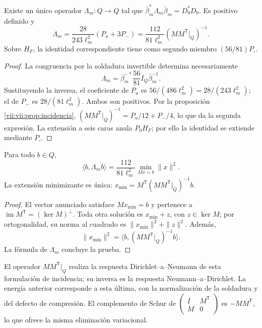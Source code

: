 \begin{theorem}
\label{vii:vii:thm:respuesta-unica}
Existe un único operador \(\Lambda_m:Q\longrightarrow Q\) tal que
\(\bar\beta_m^*\Lambda_m\bar\beta_m=D_9^*D_9\). Es positivo definido y
\begin{equation}
 \Lambda_m=\frac{28}{243\ell_m^2}(P_u+3P_-)
 =\frac{112}{81\ell_m^2}
       (MM^{\mathsf T}|_Q)^{-1}.
 \label{vii:vii:eq:lambda-pantalla}
\end{equation}
Sobre \(H_F\), la identidad correspondiente tiene como segundo miembro
\((56/81)P_\square\).
\end{theorem}

\begin{proof}
La congruencia por la soldadura invertible determina necesariamente
\[
 \Lambda_m=\bar\beta_m^{-*}\frac{56}{81}I_Q\bar\beta_m^{-1}.
\]
Sustituyendo la inversa, el coeficiente de \(P_u\) es
\(56/(486\ell_m^2)=28/(243\ell_m^2)\); el de \(P_-\) es
\(28/(81\ell_m^2)\). Ambos son positivos. Por la
proposición \ref{vii:vii:prop:incidencia},
\((MM^{\mathsf T}|_Q)^{-1}=P_u/12+P_-/4\),
lo que da la segunda expresión. La extensión a seis caras anula
\(P_0H_F\); por ello la identidad se extiende mediante \(P_\square\).
\end{proof}

\begin{proposition}
\label{vii:vii:prop:minima-extension}
Para todo \(b\in Q\),
\[
 \langle b,\Lambda_m b\rangle
 =\frac{112}{81\ell_m^2}
   \min_{Mx=b}\|x\|^2.
\]
La extensión minimizante es única:
\(x_{\min}=M^{\mathsf T}(MM^{\mathsf T}|_Q)^{-1}b\).
\end{proposition}

\begin{proof}
El vector anunciado satisface \(Mx_{\min}=b\) y pertenece a
\(\operatorname{im}M^{\mathsf T}=(\ker M)^\perp\).
Toda otra solución es \(x_{\min}+z\), con \(z\in\ker M\); por
ortogonalidad, su norma al cuadrado es \(\|x_{\min}\|^2+\|z\|^2\).
Además,
\[
 \|x_{\min}\|^2
 =\langle b,(MM^{\mathsf T}|_Q)^{-1}b\rangle.
\]
La fórmula de \(\Lambda_m\) concluye la prueba.
\end{proof}

El operador \(MM^{\mathsf T}|_Q\) realiza la respuesta
Dirichlet--a--Neumann de esta formulación de incidencia; su inversa
es la respuesta Neumann--a--Dirichlet. La energía anterior corresponde
a esta última, con la normalización de la soldadura y del defecto de
compresión. El complemento de Schur de
\(\left(\begin{smallmatrix}I&M^{\mathsf T}\\M&0\end{smallmatrix}\right)\)
es \(-MM^{\mathsf T}\), lo que ofrece la misma eliminación variacional.

